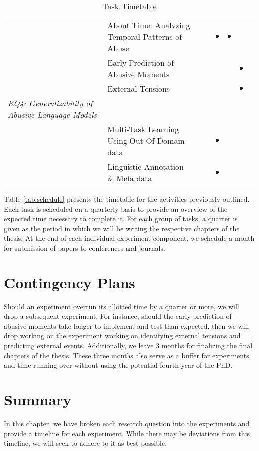 \begin{table}[]
{\begin{tabular}{ll|cccc|cc}
                                                                        & About Time: Analyzing Temporal Patterns of Abuse &           &           & $\bullet$ & $\bullet$ &           & \\
                                                                        & Early Prediction of Abusive Moments              &           &           &           &           & $\bullet$ & \\
                                                                        & External Tensions                                &           &           &           &           & $\bullet$ & \\
      \textit{RQ4: Generalizability of Abusive Language Models}         &                                                  &           &           &           &           &           & \\
                                                                        & Multi-Task Learning Using Out-Of-Domain data     &           &           & $\bullet$ &           &           & \\
                                                                        & Linguistic Annotation \& Meta data               &           &           & $\bullet$ &           &           & \\

    \end{tabular}%
    }
    
  \caption{Task Timetable}
\label{tab:schedule}
\end{table}

Table \autoref{tab:schedule} presents the timetable for the activities previously outlined. Each task is scheduled on a quarterly basis to provide an overview of the expected time necessary to complete it. For each group of tasks, a quarter is given as the period in which we will be writing the respective chapters of the thesis. At the end of each individual experiment component, we schedule a month for submission of papers to conferences and journals.

\section{Contingency Plans}

Should an experiment overrun its allotted time by a quarter or more, we will drop a subsequent experiment. For instance, should the early prediction of abusive moments take longer to implement and test than expected, then we will drop working on the experiment working on identifying external tensions and predicting external events. 
Additionally, we leave 3 months for finalizing the final chapters of the thesis. These three months also serve as a buffer for experiments and time running over without using the potential fourth year of the PhD.

\section{Summary}

In this chapter, we have broken each research question into the experiments and provide a timeline for each experiment. While there may be deviations from this timeline, we will seek to adhere to it as best possible.

